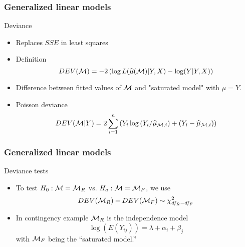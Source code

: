 \documentclass[handout]{beamer}
\begin{document}
   \begin{frame} \frametitle{Generalized linear models}

   \begin{block}
         {Deviance}
         \begin{itemize}
         \item Replaces $SSE$ in least squares

         \item Definition
   $$
   DEV({\cal M}) = -2 \left(\log L(\widehat{\mu}({\cal M})|Y,X) - \log(Y|Y,X) \right) $$

   \item Difference between fitted values of ${\cal M}$ and "saturated model" with $\widehat{\mu}=Y$.


   \item Poisson deviance
   $$
   DEV({\cal M}|Y) = 2 \sum_{i=1}^n \left( Y_i \log \left(Y_i / \widehat{\mu}_{{\cal M},i} \right) + (Y_i - \widehat{\mu}_{{\cal M},i} ) \right)
   $$
         \end{itemize}
   \end{block}
   \end{frame}


   \begin{frame} \frametitle{Generalized linear models}

   \begin{block}
         {Deviance tests}
         \begin{itemize}
         \item To test $H_0:{\cal M}={\cal M}_R$ vs. $H_a: {\cal M}={\cal M}_F$,
   we use
   $$DEV({\cal M}_R) - DEV({\cal M}_F) \sim \chi^2_{df_R-df_F}$$

   \item In contingency example ${\cal M}_R$ is the independence model
   $$
   \log(E(Y_{ij})) = \lambda + \alpha_i  + \beta_j$$
   with ${\cal M}_F$ being the ``saturated model.''


         \end{itemize}
   \end{block}
   \end{frame}


   \begin{frame} 

   \end{frame}

   
\end{document}

